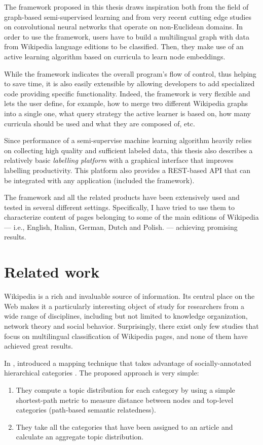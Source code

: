         The framework proposed in this thesis draws inspiration both from the field of graph-based semi-supervised learning and from very recent cutting edge studies on convolutional neural networks that operate on non-Euclidean domains. In order to use the framework, users have to build a multilingual graph with data from Wikipedia language editions to be classified. Then, they make use of an active learning algorithm based on curricula to learn node embeddings.
        
        While the framework indicates the overall program's flow of control, thus helping to save time, it is also easily extensible by allowing developers to add specialized code providing specific functionality. Indeed, the framework is very flexible and lets the user define, for example, how to merge two different Wikipedia graphs into a single one, what query strategy the active learner is based on, how many curricula should be used and what they are composed of, etc.
        
        Since performance of a semi-supervise machine learning algorithm heavily relies on collecting high quality and sufficient labeled data, this thesis also describes a relatively basic \emph{labelling platform} with a graphical interface that improves labelling productivity. This platform also provides a REST-based API that can be integrated with any application (included the framework).
        
        The framework and all the related products have been extensively used and tested in several different settings. Specifically, I have tried to use them to characterize content of pages belonging to some of the main editions of Wikipedia --- i.e., English, Italian, German, Dutch and Polish. --- achieving promising results.
    \section{Related work}
        Wikipedia is a rich and invaluable source of information. Its central place on the Web makes it a particularly interesting object of study for researchers from a wide range of disciplines, including but not limited to knowledge organization, network theory and social behavior. Surprisingly, there exist only few studies that focus on multilingual classification of Wikipedia pages, and none of them have achieved great results.
        
        In \citeyear{Kittur}, \citeauthor{Kittur} introduced a mapping technique that takes advantage of socially-annotated hierarchical categories \cite{Kittur}. The proposed approach is very simple:
        \begin{enumerate}
            \item They compute a topic distribution for each category by using a simple shortest-path metric to measure distance between nodes and top-level categories (path-based semantic relatedness).
            \item They take all the categories that have been assigned to an article and calculate an aggregate topic distribution.
        \end{enumerate}
        
